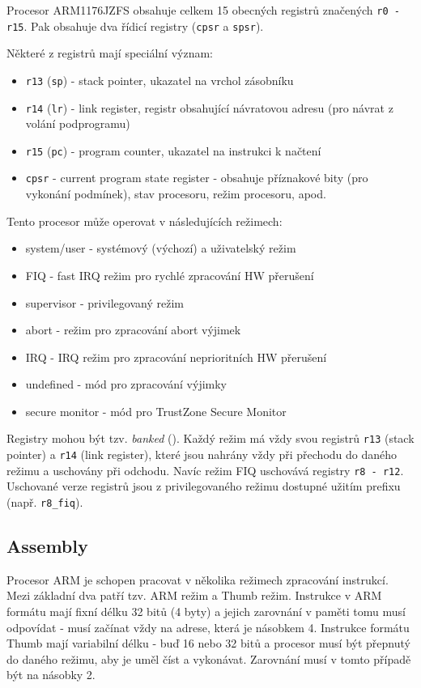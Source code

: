 \documentclass{article}
\begin{document}
Procesor ARM1176JZFS obsahuje celkem 15 obecných registrů značených \texttt{r0 - r15}. Pak obsahuje dva řídicí registry (\texttt{cpsr} a \texttt{spsr}).

Některé z registrů mají speciální význam:
\begin{itemize}
	\item \texttt{r13} (\texttt{sp}) - stack pointer, ukazatel na vrchol zásobníku
	\item \texttt{r14} (\texttt{lr}) - link register, registr obsahující návratovou adresu (pro návrat z volání podprogramu)
	\item \texttt{r15} (\texttt{pc}) - program counter, ukazatel na instrukci k načtení
	\item \texttt{cpsr} - current program state register - obsahuje příznakové bity (pro vykonání podmínek), stav procesoru, režim procesoru, apod.
\end{itemize}

Tento procesor může operovat v následujících režimech:
\begin{itemize}
	\item system/user - systémový (výchozí) a uživatelský režim
	\item FIQ - fast IRQ režim pro rychlé zpracování HW přerušení
	\item supervisor - privilegovaný režim
	\item abort - režim pro zpracování abort výjimek
	\item IRQ - IRQ režim pro zpracování neprioritních HW přerušení
	\item undefined - mód pro zpracování výjimky 
	\item secure monitor - mód pro TrustZone Secure Monitor
\end{itemize}

Registry mohou být tzv. \emph{banked} (). Každý režim má vždy svou  registrů \texttt{r13} (stack pointer) a \texttt{r14} (link register), které jsou nahrány vždy při přechodu do daného režimu a uschovány při odchodu. Navíc režim FIQ uschovává registry \texttt{r8 - r12}. Uschované verze registrů jsou z privilegovaného režimu dostupné užitím prefixu (např. \texttt{r8\_fiq}).

\subsection{Assembly}

Procesor ARM je schopen pracovat v několika režimech zpracování instrukcí. Mezi základní dva patří tzv. ARM režim a Thumb režim. Instrukce v ARM formátu mají fixní délku 32 bitů (4 byty) a jejich zarovnání v paměti tomu musí odpovídat - musí začínat vždy na adrese, která je násobkem 4. Instrukce formátu Thumb mají variabilní délku - buď 16 nebo 32 bitů a procesor musí být přepnutý do daného režimu, aby je uměl číst a vykonávat. Zarovnání musí v tomto případě být na násobky 2.
\end{document}
